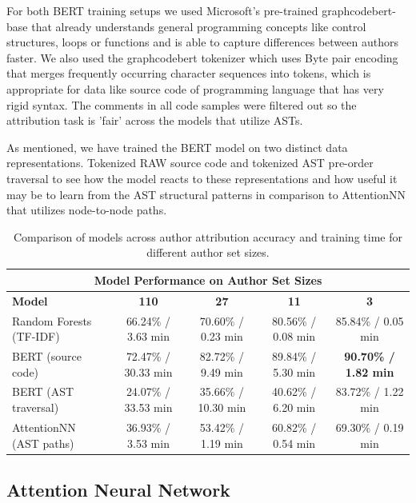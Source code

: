 \documentclass[conference]{IEEEtran}
\begin{document}
For both BERT training setups we used Microsoft's pre-trained graphcodebert-base \citet{codebert} that already understands general programming concepts like 
control structures, loops or functions and is able to capture differences between authors faster. We also used the graphcodebert tokenizer which uses 
Byte pair encoding that merges frequently occurring character sequences into tokens, which is appropriate for data like source code of programming language
that has very rigid syntax. The comments in all code samples were filtered out so the attribution task
is 'fair' across the models that utilize ASTs.

As mentioned, we have trained the BERT model on two distinct data representations. Tokenized RAW source code and tokenized AST pre-order traversal
to see how the model reacts to these representations and how useful it may be to learn from the AST structural patterns in comparison to AttentionNN 
that utilizes node-to-node paths.

\begin{table}[!ht]
    \renewcommand{\arraystretch}{1.3}
    \caption{Comparison of models across author attribution accuracy and training time for different author set sizes.}
    \label{tab:comparison_models}
    \centering
    \begin{tabular}{lcccc}
    \hline
    \multicolumn{5}{c}{\textbf{Model Performance on Author Set Sizes}} \\
    \hline
    \textbf{Model} & \textbf{110} & \textbf{27} & \textbf{11} & \textbf{3} \\
    \hline
    Random Forests (TF-IDF) & 66.24\% / 3.63 min & 70.60\% / 0.23 min & 80.56\% / 0.08 min & 85.84\% / 0.05 min \\
    BERT (source code)    & 72.47\% / 30.33 min & 82.72\% / 9.49 min & 89.84\% / 5.30 min  & \textbf{90.70\% / 1.82 min} \\
    BERT (AST traversal)  & 24.07\% / 33.53 min & 35.66\% / 10.30 min & 40.62\% / 6.20 min  & 83.72\% / 1.22 min \\
    AttentionNN (AST paths)& 36.93\% / 3.53 min  & 53.42\% / 1.19 min  & 60.82\% / 0.54 min  & 69.30\% / 0.19 min \\
    \hline
    \end{tabular}
\end{table}

\subsection{Attention Neural Network}
\end{document}
